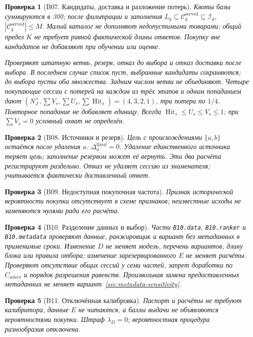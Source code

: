 \documentclass[12pt,a4paper]{article}
\newcommand{\code}[1]{{\ttfamily\small\nolinkurl{#1}}}
\theoremstyle{plainru}
\newtheorem{testcase}{Проверка}[section]
\begin{document}
\begin{testcase}[B07. Кандидаты, доставка и разложение потерь]
Квоты базы суммируются в 300; после фильтрации и заполнения
$L_q\subseteq\mathcal C_q^{\mathrm{served}}\subseteq\mathcal I_q$,
$|\mathcal C_q^{\mathrm{served}}|\le M$.
Малый каталог не дополняют недопустимыми товарами; общий предел $K$
не требует равной фактической длины ответов.
Покупку вне кандидатов не добавляют при обучении или оценке.

Проверяют штатную ветвь, резерв, отказ до выбора и отказ доставки
после выбора. В последнем случае список пуст, выбранные кандидаты
сохраняются; до выбора пусты оба множества. Задним числом ветви не объединяют.
Четыре покупающие сессии с потерей на каждом из трёх этапов и одним
попаданием дают $(N_J^+,\sum V_s,\sum U_s,\sum\operatorname{Hit}_s)
=(4,3,2,1)$, три потери по $1/4$.
Повторное попадание не добавляет единицу. Всегда
$\operatorname{Hit}_s\le U_s\le V_s\le1$;
при $\sum V_s=0$ условный охват не определён.
\end{testcase}

\begin{testcase}[B08. Источники и резерв]
Цель с происхождениями $\{a,b\}$ остаётся после удаления $a$:
$\Delta_a^{\mathrm{fixed}}=0$. Удаление единственного источника
теряет цель; заполнение резервом может её вернуть.
Эти два расчёта регистрируют раздельно. Отказ не удаляет сессию
из знаменателя; учитывается фактически доставленный ответ.
\end{testcase}

\begin{testcase}[B09. Недоступная покупочная частота]
Признак исторической вероятности покупки отсутствует в схеме признаков;
неизвестные исходы не заменяются нулями ради его расчёта.
\end{testcase}

\begin{testcase}[B10. Разделение данных и выбор]
Части \code{B10.data}, \code{B10.ranker} и \code{B10.metadata}
проверяют данные, ранжировщик и вариант без метаданных в применимые сроки.
Изменение $D$ не меняет модель, перечень вариантов, длину блока
или правила отбора; изменение зарезервированного $E$ не меняет расчёты.
Проверяют отсутствие
общих сессий у семи частей, запрет доработки по $C_{\mathrm{select}}$
и порядок разрешения равенств. Произвольная замена предоставленных
метаданных не меняет вариант~\ref{sec:metadata-sensitivity}.
\end{testcase}

\begin{testcase}[B11. Отключённая калибровка]
Паспорт и расчёты не требуют калибратора, данные $E$ не читаются,
а баллы выдачи не объявляются вероятностями покупки.
Штраф $\lambda_D=0$; вероятностная процедура разнообразия отключена.
\end{testcase}
\end{document}
